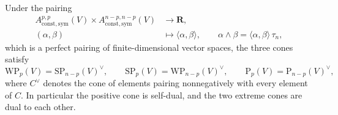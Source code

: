 \begin{theorem}
\label{thm:ch09-positivity-duality}
Under the pairing
\[
 \begin{aligned}
 A_{\mathrm{const},\mathrm{sym}}^{p,p}(V)
 \times A_{\mathrm{const},\mathrm{sym}}^{n-p,n-p}(V)
 &\longrightarrow\mathbf R,\\
 (\alpha,\beta)&\longmapsto\langle\alpha,\beta\rangle,
 \qquad
 \alpha\wedge\beta=\langle\alpha,\beta\rangle\,\tau_n,
 \end{aligned}
\]
which is a perfect pairing of finite-dimensional vector spaces, the three
cones satisfy
\[
 \mathrm{WP}_p(V)=\mathrm{SP}_{n-p}(V)^\vee,
 \qquad
 \mathrm{SP}_p(V)=\mathrm{WP}_{n-p}(V)^\vee,
 \qquad
 \mathrm{P}_p(V)=\mathrm{P}_{n-p}(V)^\vee,
\]
where $C^\vee$ denotes the cone of elements pairing nonnegatively with every
element of $C$.  In particular the positive cone is self-dual, and the two
extreme cones are dual to each other.
\end{theorem}

